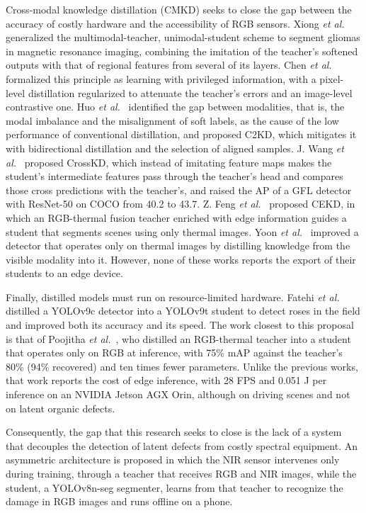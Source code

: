 \documentclass[journal]{IEEEtran}
\begin{document}
Cross-modal knowledge distillation (CMKD) seeks to close the gap between the accuracy of costly hardware and the accessibility of RGB sensors. Xiong \emph{et al.}~\cite{xiong2023} generalized the multimodal-teacher, unimodal-student scheme to segment gliomas in magnetic resonance imaging, combining the imitation of the teacher's softened outputs with that of regional features from several of its layers. Chen \emph{et al.}~\cite{chen2022} formalized this principle as learning with privileged information, with a pixel-level distillation regularized to attenuate the teacher's errors and an image-level contrastive one. Huo \emph{et al.}~\cite{huo2024} identified the gap between modalities, that is, the modal imbalance and the misalignment of soft labels, as the cause of the low performance of conventional distillation, and proposed C2KD, which mitigates it with bidirectional distillation and the selection of aligned samples. J. Wang \emph{et al.}~\cite{wang2024} proposed CrossKD, which instead of imitating feature maps makes the student's intermediate features pass through the teacher's head and compares those cross predictions with the teacher's, and raised the AP of a GFL detector with ResNet-50 on COCO from 40.2 to 43.7. Z. Feng \emph{et al.}~\cite{feng2023} proposed CEKD, in which an RGB-thermal fusion teacher enriched with edge information guides a student that segments scenes using only thermal images. Yoon \emph{et al.}~\cite{yoon2026} improved a detector that operates only on thermal images by distilling knowledge from the visible modality into it. However, none of these works reports the export of their students to an edge device.

Finally, distilled models must run on resource-limited hardware. Fatehi \emph{et al.}~\cite{fatehi2025} distilled a YOLOv9c detector into a YOLOv9t student to detect roses in the field and improved both its accuracy and its speed. The work closest to this proposal is that of Poojitha \emph{et al.}~\cite{poojitha2026}, who distilled an RGB-thermal teacher into a student that operates only on RGB at inference, with 75\% mAP against the teacher's 80\% (94\% recovered) and ten times fewer parameters. Unlike the previous works, that work reports the cost of edge inference, with 28 FPS and 0.051 J per inference on an NVIDIA Jetson AGX Orin, although on driving scenes and not on latent organic defects.

Consequently, the gap that this research seeks to close is the lack of a system that decouples the detection of latent defects from costly spectral equipment. An asymmetric architecture is proposed in which the NIR sensor intervenes only during training, through a teacher that receives RGB and NIR images, while the student, a YOLOv8n-seg segmenter, learns from that teacher to recognize the damage in RGB images and runs offline on a phone.
\end{document}
